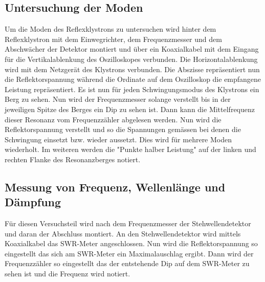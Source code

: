 \subsection{Untersuchung der Moden}
\label{sec:moden}
Um die Moden des Reflexklystrons zu untersuchen wird hinter dem Reflexklystron mit dem Einwegrichter, dem 
Frequenzmesser und dem Abschwächer der Detektor montiert und über ein Koaxialkabel mit dem Eingang
für die Vertikalablenkung des Oszilloskopes verbunden. Die Horizontalablenkung wird mit dem Netzgerät des Klystrons
verbunden. Die Abszisse repräsentiert nun die Reflektorspannung während die Ordinate auf dem Oszilloskop
die empfangene Leistung repräsentiert. Es ist nun für jeden Schwingungsmodus des Klystrons ein Berg zu sehen.
Nun wird der Frequenzmesser solange verstellt bis in der jeweiligen Spitze des Berges ein Dip zu sehen ist.
Dann kann die Mittelfrequenz dieser Resonanz vom Frequenzzähler abgelesen werden. Nun wird die Reflektorspannung
verstellt und so die Spannungen gemässen bei denen die Schwingung einsetzt bzw. wieder aussetzt. Dies wird für mehrere
Moden wiederholt. Im weiteren werden die "Punkte halber Leistung" auf der linken und rechten Flanke des 
Resonanzberges notiert.

\subsection{Messung von Frequenz, Wellenlänge und Dämpfung}
\label{sec:frequenzmessung}
Für diesen Versuchsteil wird nach dem Frequenzmesser der Stehwellendetektor und daran der Abschluss montiert.
An den Stehwellendetektor wird mittels Koaxialkabel das SWR-Meter angeschlossen. Nun wird die Reflektorspannung
so eingestellt das sich am SWR-Meter ein Maximalauschlag ergibt. Dann wird der Frequenzzähler so eingestellt das 
der entstehende Dip auf dem SWR-Meter zu sehen ist und die Frequenz wird notiert.
